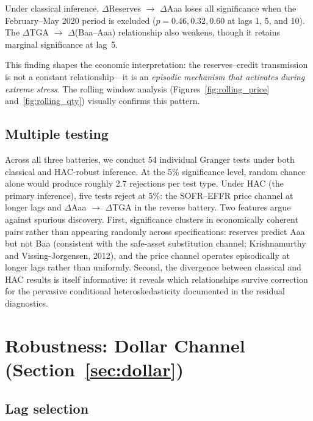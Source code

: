\documentclass[12pt,a4paper]{article}
\begin{document}
Under classical inference, $\Delta$Reserves $\rightarrow$ $\Delta$Aaa loses all significance when the February--May 2020 period is excluded ($p = 0.46, 0.32, 0.60$ at lags 1, 5, and 10). The $\Delta$TGA $\rightarrow$ $\Delta$(Baa--Aaa) relationship also weakens, though it retains marginal significance at lag~5.

This finding shapes the economic interpretation: the reserves--credit transmission is not a constant relationship---it is an \emph{episodic mechanism that activates during extreme stress}. The rolling window analysis (Figures~\ref{fig:rolling_price} and~\ref{fig:rolling_qty}) visually confirms this pattern.

\subsection{Multiple testing}

Across all three batteries, we conduct 54 individual Granger tests under both classical and HAC-robust inference. At the 5\% significance level, random chance alone would produce roughly 2.7 rejections per test type. Under HAC (the primary inference), five tests reject at 5\%: the SOFR--EFFR price channel at longer lags and $\Delta$Aaa $\rightarrow$ $\Delta$TGA in the reverse battery. Two features argue against spurious discovery. First, significance clusters in economically coherent pairs rather than appearing randomly across specifications: reserves predict Aaa but not Baa (consistent with the safe-asset substitution channel; Krishnamurthy and Vissing-Jorgensen, 2012), and the price channel operates episodically at longer lags rather than uniformly. Second, the divergence between classical and HAC results is itself informative: it reveals which relationships survive correction for the pervasive conditional heteroskedasticity documented in the residual diagnostics.


\section{Robustness: Dollar Channel (Section~\ref{sec:dollar})}
\label{app:dollar_robust}

\subsection{Lag selection}


\end{document}
